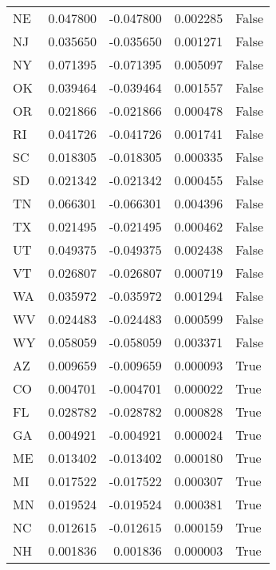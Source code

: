 \begin{table}
\begin{tabular}{lrrrl}
      NE &   0.047800 & -0.047800 &       0.002285 &         False \\
      NJ &   0.035650 & -0.035650 &       0.001271 &         False \\
      NY &   0.071395 & -0.071395 &       0.005097 &         False \\
      OK &   0.039464 & -0.039464 &       0.001557 &         False \\
      OR &   0.021866 & -0.021866 &       0.000478 &         False \\
      RI &   0.041726 & -0.041726 &       0.001741 &         False \\
      SC &   0.018305 & -0.018305 &       0.000335 &         False \\
      SD &   0.021342 & -0.021342 &       0.000455 &         False \\
      TN &   0.066301 & -0.066301 &       0.004396 &         False \\
      TX &   0.021495 & -0.021495 &       0.000462 &         False \\
      UT &   0.049375 & -0.049375 &       0.002438 &         False \\
      VT &   0.026807 & -0.026807 &       0.000719 &         False \\
      WA &   0.035972 & -0.035972 &       0.001294 &         False \\
      WV &   0.024483 & -0.024483 &       0.000599 &         False \\
      WY &   0.058059 & -0.058059 &       0.003371 &         False \\
      AZ &   0.009659 & -0.009659 &       0.000093 &          True \\
      CO &   0.004701 & -0.004701 &       0.000022 &          True \\
      FL &   0.028782 & -0.028782 &       0.000828 &          True \\
      GA &   0.004921 & -0.004921 &       0.000024 &          True \\
      ME &   0.013402 & -0.013402 &       0.000180 &          True \\
      MI &   0.017522 & -0.017522 &       0.000307 &          True \\
      MN &   0.019524 & -0.019524 &       0.000381 &          True \\
      NC &   0.012615 & -0.012615 &       0.000159 &          True \\
      NH &   0.001836 &  0.001836 &       0.000003 &          True \\

\end{tabular}
\end{table}
